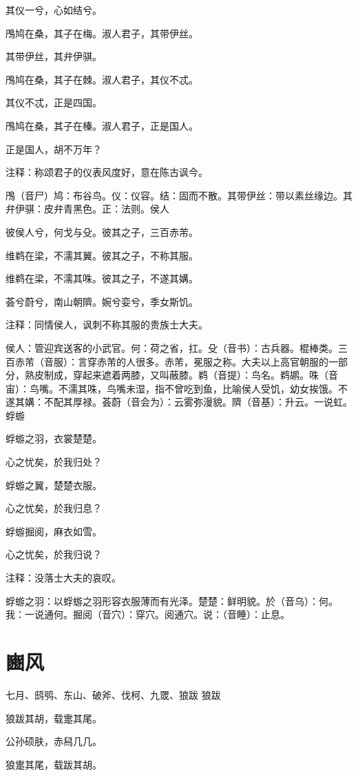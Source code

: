 \documentclass[12pt,UTF8]{ctexbook}
\begin{document}
其仪一兮，心如结兮。

鳲鸠在桑，其子在梅。淑人君子，其带伊丝。

其带伊丝，其弁伊骐。

鳲鸠在桑，其子在棘。淑人君子，其仪不忒。

其仪不忒，正是四国。

鳲鸠在桑，其子在榛。淑人君子，正是国人。

正是国人，胡不万年？

注释：称颂君子的仪表风度好，意在陈古讽今。

鳲（音尸）鸠：布谷鸟。仪：仪容。结：固而不散。其带伊丝：带以素丝缘边。其弁伊骐：皮弁青黑色。正：法则。侯人

彼侯人兮，何戈与殳。彼其之子，三百赤芾。

维鹈在梁，不濡其翼。彼其之子，不称其服。

维鹈在梁，不濡其咮。彼其之子，不遂其媾。

荟兮蔚兮，南山朝隮。婉兮娈兮，季女斯饥。

注释：同情侯人，讽刺不称其服的贵族士大夫。

侯人：管迎宾送客的小武官。何：荷之省，扛。殳（音书）：古兵器。棍棒类。三百赤芾（音服）：言穿赤芾的人很多。赤芾，冕服之称。大夫以上高官朝服的一部分，熟皮制成，穿起来遮着两膝，又叫蔽膝。鹈（音提）：鸟名。鹈鹕。咮（音宙）：鸟嘴。不濡其咮，鸟嘴未湿，指不曾吃到鱼，比喻侯人受饥，幼女挨饿。不遂其媾：不配其厚禄。荟蔚（音会为）：云雾弥漫貌。隮（音基）：升云。一说虹。蜉蝣

蜉蝣之羽，衣裳楚楚。

心之忧矣，於我归处？

蜉蝣之翼，楚楚衣服。

心之忧矣，於我归息？

蜉蝣掘阅，麻衣如雪。

心之忧矣，於我归说？

注释：没落士大夫的哀叹。

蜉蝣之羽：以蜉蝣之羽形容衣服薄而有光泽。楚楚：鲜明貌。於（音乌）：何。我：一说通何。掘阅（音穴）：穿穴。阅通穴。说：（音睡）：止息。



\part{豳风}
七月、鸱鸮、东山、破斧、伐柯、九罭、狼跋
狼跋

狼跋其胡，载疐其尾。

公孙硕肤，赤舄几几。

狼疐其尾，载跋其胡。
\end{document}
